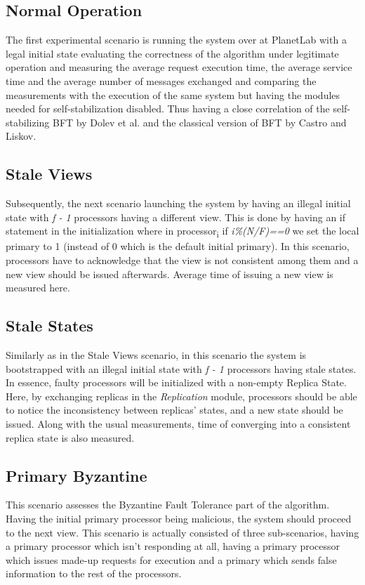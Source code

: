\documentclass[12pt,a4paper]{report}
\begin{document}
    		\subsection{Normal Operation}
    		The first experimental scenario is running the system over at PlanetLab with a legal initial state evaluating the correctness of the algorithm under legitimate operation  and measuring the average request execution time, the average service time and the average number of messages exchanged and comparing the measurements with the execution of the same system but having the modules needed for self-stabilization disabled. Thus having a close correlation of the self-stabilizing BFT by Dolev et al. and the classical version of BFT by Castro and Liskov.
    		
    		\subsection{Stale Views}
    		Subsequently, the next scenario launching the system by having an illegal initial state with \textit{f - 1} processors having a different view. This is done by having an if statement in the initialization where in processor\textsubscript{i} if \textit{i\%(N/F)==0} we set the local primary to 1 (instead of 0 which is the default initial primary). In this scenario, processors have to acknowledge that the view is not consistent among them and a new view should be issued afterwards. Average time of issuing a new view is measured here.
    		
    		\subsection{Stale States}
    		Similarly as in the Stale Views scenario, in this scenario the system is bootstrapped with an illegal initial state with \textit{f - 1} processors having stale states. In essence, faulty processors will be initialized with a non-empty Replica State. Here, by exchanging replicas in the \textit{Replication} module, processors should be able to notice the inconsistency between replicas' states, and a new state should be issued. Along with the usual measurements, time of converging into a consistent replica state is also measured.
    		
    	    \subsection{Primary Byzantine}
    	    This scenario assesses the Byzantine Fault Tolerance part of the algorithm. Having the initial primary processor being malicious, the system should proceed to the next view. This scenario is actually consisted of three sub-scenarios, having a primary processor which isn't responding at all, having a primary processor which issues made-up requests for execution and a primary which sends false information to the rest of the processors.
    		
\end{document}
